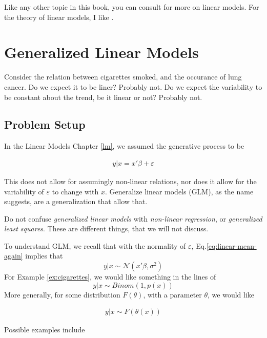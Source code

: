 \documentclass[]{book}
\theoremstyle{definition}
\theoremstyle{definition}
\theoremstyle{remark}
\let\BeginKnitrBlock\begin \let\EndKnitrBlock\end
\begin{document}
Like any other topic in this book, you can consult
\citet{venables2013modern} for more on linear models. For the theory of
linear models, I like \citet{greene2003econometric}.

\chapter{Generalized Linear Models}\label{glm}

\BeginKnitrBlock{example}
\protect\hypertarget{ex:cigarettes}{}{\label{ex:cigarettes}}Consider the
relation between cigarettes smoked, and the occurance of lung cancer. Do
we expect it to be liner? Probably not. Do we expect the variability to
be constant about the trend, be it linear or not? Probably not.
\EndKnitrBlock{example}

\section{Problem Setup}\label{problem-setup-1}

In the Linear Models Chapter \ref{lm}, we assumed the generative process
to be

\begin{align}
  y|x=x'\beta+\varepsilon
  \label{eq:linear-mean-again}
\end{align}

This does not allow for assumingly non-linear relations, nor does it
allow for the variability of \(\varepsilon\) to change with \(x\).
Generalize linear models (GLM), as the name suggests, are a
generalization that allow that.

\BeginKnitrBlock{remark}
Do not confuse \emph{generalized linear models}
with \emph{non-linear regression}, or \emph{generalized least squares}.
These are different things, that we will not discuss.
\EndKnitrBlock{remark}

To understand GLM, we recall that with the normality of \(\varepsilon\),
Eq.\eqref{eq:linear-mean-again} implies that \[
 y|x \sim \mathcal{N}(x'\beta, \sigma^2)
\] For Example \ref{ex:cigarettes}, we would like something in the lines
of \[
 y|x \sim Binom(1,p(x))
\] More generally, for some distribution \(F(\theta)\), with a parameter
\(\theta\), we would like

\begin{align}
  y|x \sim F(\theta(x))
\end{align}

Possible examples include
\end{document}
